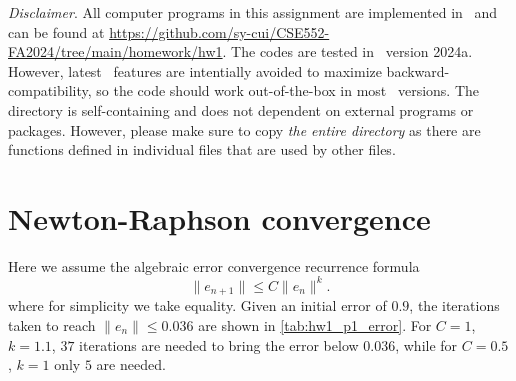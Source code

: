 \pagestyle{fancy}
\setlength{\headheight}{16pt}
\fancyhead{} %
\fancyfoot{} %
\fancyfoot[C]{\thepage}

\noindent \emph{Disclaimer}. All computer programs in this assignment are implemented in \matlab~and can be found at \url{https://github.com/sy-cui/CSE552-FA2024/tree/main/homework/hw1}. 
The codes are tested in \matlab~version 2024a. 
However, latest \matlab~features are intentially avoided to maximize backward-compatibility, so the code should work out-of-the-box in most \matlab~versions. 
The directory is self-containing and does not dependent on external programs or packages. 
However, please make sure to copy \emph{the entire directory} as there are functions defined in individual files that are used by other files. 


\section{Newton-Raphson convergence}
Here we assume the algebraic error convergence recurrence formula 
\begin{equation}\label{eqn:hw1_p1_error}
    \| e_{n+1} \| \leq C \| e_n \|^k.
\end{equation}
where for simplicity we take equality. 
Given an initial error of $0.9$, the iterations taken to reach $\| e_n \| \leq 0.036$ are shown in \cref{tab:hw1_p1_error}.
For $C=1$, $k=1.1$, $37$ iterations are needed to bring the error below $0.036$, while for $C=0.5$, $k=1$ only $5$ are needed. 

